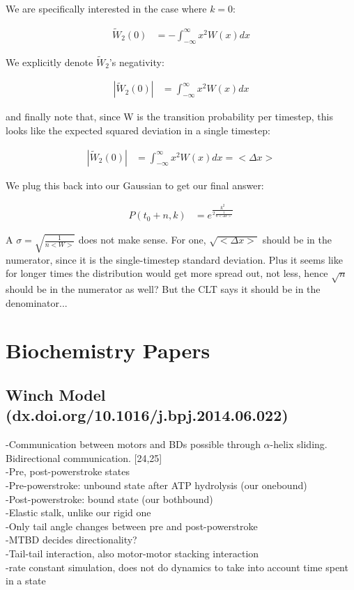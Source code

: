\documentclass[10pt]{article} %
\begin{document}
We are specifically interested in the case where $k=0$:

\begin{align*}
  \widetilde{W}_2(0) &= -\int_{-\infty}^\infty x^2W(x)dx
\end{align*}

We explicitly denote $\widetilde{W}_2$'s negativity:

\begin{align*}
  |\widetilde{W}_2(0)| &= \int_{-\infty}^\infty x^2W(x)dx
\end{align*}

and finally note that, since W is the transition probability per timestep, this looks like the expected squared deviation
in a single timestep:

\begin{align*}
  |\widetilde{W}_2(0)| &= \int_{-\infty}^\infty x^2W(x)dx = <\Delta x>
\end{align*}

We plug this back into our Gaussian to get our final answer:

\begin{align}
  P(t_0+n,k) &= e^{\frac{k^2}{2\frac{1}{n<\Delta x>}}}
\end{align}

A $\sigma = \sqrt{\frac{1}{n<W>}}$ does not make sense. For one, $\sqrt{<\Delta x>}$ should be in the numerator, since it is the
single-timestep standard deviation. Plus it seems like for longer times the distribution would get more spread out, not less, hence
$\sqrt{n}$ should be in the numerator as well? But the CLT says it should be in the denominator...

\section{Biochemistry Papers}

\subsection{Winch Model (dx.doi.org/10.1016/j.bpj.2014.06.022)}
-Communication between motors and BDs possible through $\alpha$-helix sliding. Bidirectional communication. [24,25]\\
-Pre, post-powerstroke states\\
-Pre-powerstroke: unbound state after ATP hydrolysis (our onebound)\\
-Post-powerstroke: bound state (our bothbound)\\
-Elastic stalk, unlike our rigid one\\
-Only tail angle changes between pre and post-powerstroke\\
-MTBD decides directionality?\\
-Tail-tail interaction, also motor-motor stacking interaction\\
-rate constant simulation, does not do dynamics to take into account time spent in a state\\
\end{document}
